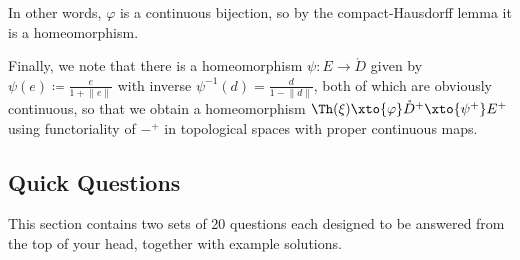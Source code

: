 \begin{solution}
\begin{enumerate}
			In other words, $\varphi$ is a continuous bijection, so by the compact-Hausdorff lemma it is a homeomorphism.

			Finally, we note that there is a homeomorphism $\psi\colon E \to \mathring{D}$ given by $\psi(e) \coloneq \frac{e}{1 + \lVert e\rVert}$ with inverse $\psi^{-1}(d) = \frac{d}{1 - \lVert d\rVert}$, both of which are obviously continuous, so that we obtain a homeomorphism $\Th(\xi) \xto{\varphi} \mathring{D}^+ \xto{\psi^+} E^+$ using functoriality of ${{-}}^+$ in topological spaces with proper continuous maps.
			\qedhere
	\end{enumerate}
\end{solution}

\subsection{Quick Questions}\label{sect:quickquest}
This section contains two sets of 20 questions each designed to be answered from the top of your head, together with example solutions.

